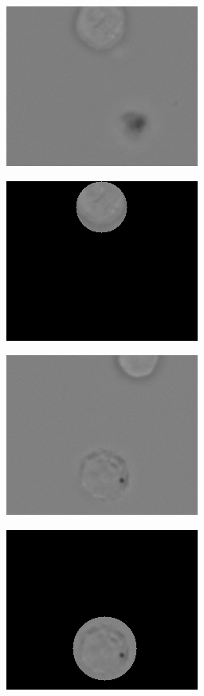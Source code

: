 {\begin{figure}[t]
	\begin{center}
		\begin{subfigure}[b]{0.33\textwidth}
			\includegraphics[height= 0.20\textheight]{thesis-template-master/images/hd1 (4400).png}
			\caption{}
			\label{fig:res18}
		\end{subfigure}
		\begin{subfigure}[b]{0.33\textwidth}
			\includegraphics[height= 0.20\textheight]{thesis-template-master/images/hd1 (4400) (1).png}
			\caption{}
			\label{fig:cellnet}
		\end{subfigure}
		\begin{subfigure}[b]{0.33\textwidth}
			\includegraphics[height= 0.20\textheight]{thesis-template-master/images/hd1 (4550).png}
			\caption{}
			\label{fig:cellnet}
		\end{subfigure}
		\begin{subfigure}[b]{0.33\textwidth}
			\includegraphics[height= 0.20\textheight]{thesis-template-master/images/hd1 (4550) (1).png}

\end{subfigure}
\end{center}
\end{figure}}
